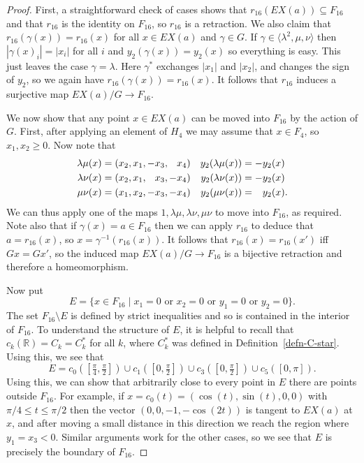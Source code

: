\documentclass[reqno]{amsart}
\newcommand{\gm}        {\gamma}
\newcommand{\lm}        {\lambda}
\newcommand{\R}         {{\mathbb{R}}}
\newcommand{\ip}[1]     {\langle #1\rangle}
\newcommand{\st}        {\;|\;}
\newcommand{\sm}        {\setminus}
\newcommand{\sse}       {\subseteq}
\newcommand{\ppi}       {\tfrac{\pi}{2}}
\newcommand{\pp}        {\hphantom{+}}
\renewcommand{\:}{\colon}
\theoremstyle{definition}
\begin{document}
\begin{proof}
 First, a straightforward check of cases shows that
 $r_{16}(EX(a))\sse F_{16}$ and that $r_{16}$ is the identity on $F_{16}$,
 so $r_{16}$ is a retraction.  We also claim that
 $r_{16}(\gm(x))=r_{16}(x)$ for all $x\in EX(a)$ and $\gm\in G$.  If
 $\gm\in\ip{\lm^2,\mu,\nu}$ then $|\gm(x)_i|=|x_i|$ for all $i$ and
 $y_2(\gm(x))=y_2(x)$ so everything is easy.  This just leaves the
 case $\gm=\lm$.  Here $\gm^*$ exchanges $|x_1|$ and $|x_2|$, and
 changes the sign of $y_2$, so we again have
 $r_{16}(\gm(x))=r_{16}(x)$.  It follows that $r_{16}$ induces a
 surjective map $EX(a)/G\to F_{16}$.

 We now show that any point $x\in EX(a)$ can be moved into $F_{16}$
 by the action of $G$.  First, after applying an element of $H_4$ we may
 assume that $x\in F_4$, so $x_1,x_2\geq 0$.  Now note that
 \begin{align*}
  \lm\mu(x) &= (x_2,x_1,   -x_3,\pp x_4) & y_2(\lm\mu(x)) &= -y_2(x) \\
  \lm\nu(x) &= (x_2,x_1,\pp x_3,   -x_4) & y_2(\lm\nu(x)) &= -y_2(x) \\
  \mu\nu(x) &= (x_1,x_2,   -x_3,   -x_4) & y_2(\mu\nu(x)) &= \pp y_2(x).
 \end{align*}
 We can thus apply one of the maps $1,\lm\mu,\lm\nu,\mu\nu$ to move
 into $F_{16}$, as required.  Note also that if $\gm(x)=a\in F_{16}$
 then we can apply $r_{16}$ to deduce that $a=r_{16}(x)$, so
 $x=\gm^{-1}(r_{16}(x))$.  It follows that $r_{16}(x)=r_{16}(x')$ iff
 $Gx=Gx'$, so the induced map $EX(a)/G\to F_{16}$ is a bijective
 retraction and therefore a homeomorphism.

 Now put
 \[ E = \{x\in F_{16}\st x_1=0 \text{ or } x_2 = 0 \text{ or }
          y_1 = 0 \text{ or } y_2 = 0\}.
 \]
 The set $F_{16}\sm E$ is defined by strict inequalities and so is
 contained in the interior of $F_{16}$.  To understand the structure
 of $E$, it is helpful to recall that $c_k(\R)=C_k=C_k^*$ for all $k$,
 where $C_k^*$ was defined in Definition~\ref{defn-C-star}.  Using
 this, we see that
 \[ E =
    c_0([\tfrac{\pi}{4},\ppi]) \cup
    c_1([0,\ppi]) \cup
    c_3([0,\ppi]) \cup
    c_5([0,\pi]).
 \]
 Using this, we can show that arbitrarily close to every point in $E$
 there are points outside $F_{16}$.  For example, if
 $x=c_0(t)=(\cos(t),\sin(t),0,0)$ with $\pi/4\leq t\leq\pi/2$ then the
 vector $(0,0,-1,-\cos(2t))$ is tangent to $EX(a)$ at $x$, and after
 moving a small distance in this direction we reach the region where
 $y_1=x_3<0$.  Similar arguments work for the other cases, so we see
 that $E$ is precisely the boundary of $F_{16}$.


\end{proof}
\end{document}

